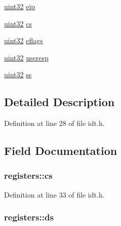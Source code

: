 \begin{DoxyCompactItemize}
\item 
\hyperlink{int__types_8h_a1134b580f8da4de94ca6b1de4d37975e}{uint32} \hyperlink{structregisters_a03c14a7c18730b4fa3fd60e9a2cfaf06}{eip}
\item 
\hyperlink{int__types_8h_a1134b580f8da4de94ca6b1de4d37975e}{uint32} \hyperlink{structregisters_adba99e37c71ff2f75a6c77d48be0a7ca}{cs}
\item 
\hyperlink{int__types_8h_a1134b580f8da4de94ca6b1de4d37975e}{uint32} \hyperlink{structregisters_aa4a09db03ac34c020ce8842b7724214d}{eflags}
\item 
\hyperlink{int__types_8h_a1134b580f8da4de94ca6b1de4d37975e}{uint32} \hyperlink{structregisters_ad7233aa5c26fc03fddda95d96f7bd259}{useresp}
\item 
\hyperlink{int__types_8h_a1134b580f8da4de94ca6b1de4d37975e}{uint32} \hyperlink{structregisters_a8e5909fb1d1fb5c5982513cffc2fd516}{ss}
\end{DoxyCompactItemize}


\subsection{Detailed Description}


Definition at line 28 of file idt.h.



\subsection{Field Documentation}
\hypertarget{structregisters_adba99e37c71ff2f75a6c77d48be0a7ca}{
\subsubsection[{cs}]{ {\bf registers::cs}}}
\label{structregisters_adba99e37c71ff2f75a6c77d48be0a7ca}


Definition at line 33 of file idt.h.

\hypertarget{structregisters_a5bca43779caa99b6546c67c92fa96795}{
\subsubsection[{ds}]{ {\bf registers::ds}}}
\label{structregisters_a5bca43779caa99b6546c67c92fa96795}


